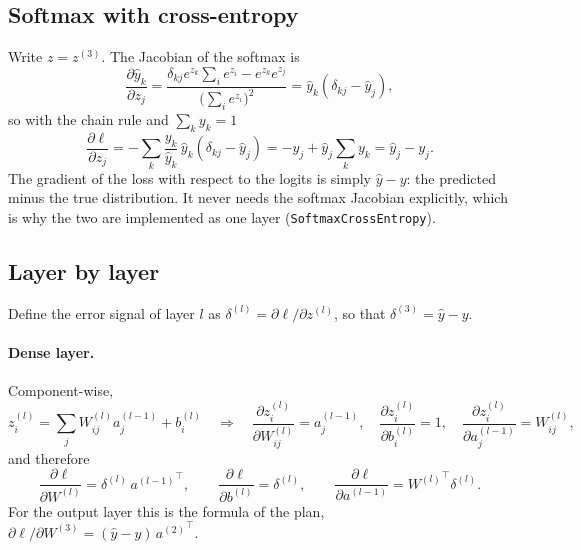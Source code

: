 \documentclass[11pt,a4paper]{article}
\newcommand{\1}{\mathbf{1}}
\begin{document}
\subsection{Softmax with cross-entropy}
Write $z = z^{(3)}$. The Jacobian of the softmax is
\begin{equation}
  \frac{\partial \hat y_k}{\partial z_j}
  = \frac{\delta_{kj} e^{z_k} \sum_i e^{z_i} - e^{z_k} e^{z_j}}{\bigl(\sum_i e^{z_i}\bigr)^2}
  = \hat y_k (\delta_{kj} - \hat y_j),
\end{equation}
so with the chain rule and $\sum_k y_k = 1$
\begin{equation}
  \frac{\partial \ell}{\partial z_j}
  = -\sum_k \frac{y_k}{\hat y_k}\, \hat y_k (\delta_{kj} - \hat y_j)
  = -y_j + \hat y_j \sum_k y_k
  = \hat y_j - y_j .
\end{equation}
The gradient of the loss with respect to the logits is simply $\hat y - y$: the predicted minus
the true distribution. It never needs the softmax Jacobian explicitly, which is why the two are
implemented as one layer (\texttt{SoftmaxCrossEntropy}).

\subsection{Layer by layer}
Define the error signal of layer $l$ as $\delta^{(l)} = \partial \ell / \partial z^{(l)}$, so that
$\delta^{(3)} = \hat y - y$.

\paragraph{Dense layer.} Component-wise,
\begin{equation*}
  z^{(l)}_i = \sum_j W^{(l)}_{ij} a^{(l-1)}_j + b^{(l)}_i
  \quad\Rightarrow\quad
  \frac{\partial z^{(l)}_i}{\partial W^{(l)}_{ij}} = a^{(l-1)}_j, \quad
  \frac{\partial z^{(l)}_i}{\partial b^{(l)}_i} = 1, \quad
  \frac{\partial z^{(l)}_i}{\partial a^{(l-1)}_j} = W^{(l)}_{ij},
\end{equation*}
and therefore
\begin{equation}
  \frac{\partial \ell}{\partial W^{(l)}} = \delta^{(l)} \, {a^{(l-1)}}^{\top}, \qquad
  \frac{\partial \ell}{\partial b^{(l)}} = \delta^{(l)}, \qquad
  \frac{\partial \ell}{\partial a^{(l-1)}} = {W^{(l)}}^{\top} \delta^{(l)} .
  \label{eq:dense}
\end{equation}
For the output layer this is the formula of the plan,
$\partial \ell / \partial W^{(3)} = (\hat y - y)\, {a^{(2)}}^{\top}$.
\end{document}
